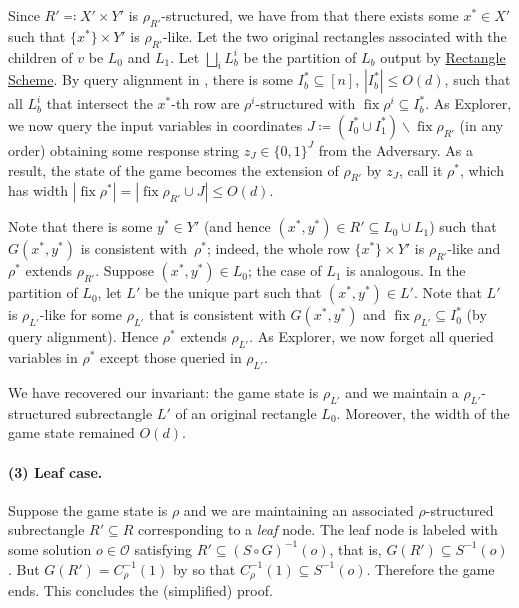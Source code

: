\documentclass{toc}
\newcommand{\rectlemma}{\expref{Lemma}{lem:scheme}\xspace}%
\newcommand{\rectscheme}{\hyperref[alg:partition]{Rectangle Scheme}\xspace}
\DeclareMathOperator{\fix}{fix}
\newcommand{\calO}{\mathcal{O}}
\begin{document}
Since $R' \eqqcolon X' \times Y'$ is $\rho_{R'}$-structured, we have from  that there exists some $x^*\in X'$ such that $\{x^*\}\times Y'$ is $\rho_{R'}$-like. Let the two original rectangles associated with the children of $v$ be $L_0$ and $L_1$. Let $\bigsqcup_i L_b^i$ be the partition of $L_b$ output by \rectscheme. By query alignment in \rectlemma, there is some $I_b^*\subseteq [n]$, $|I_b^*|\leq O(d)$, such that all $L_b^i$ that intersect the $x^*$-th row are $\rho^i$-structured with $\fix\rho^i\subseteq I_b^*$. As Explorer, we now query the input variables in coordinates $J\coloneqq (I_0^* \cup I_1^*) \smallsetminus \fix\rho_{R'}$ (in any order) obtaining some response string $z_J\in\{0,1\}^J$ from the Adversary. As a result, the state of the game becomes the extension of $\rho_{R'}$ by $z_J$, call it $\rho^*$, which has width $|\!\fix\rho^*|=|\!\fix\rho_{R'}\cup J|\leq O(d)$.

Note that there is some $y^*\in Y'$ (and hence $(x^*, y^*) \in R'\subseteq L_0\cup L_1$) such that $G(x^*,y^*)$ is consistent with~$\rho^*$; indeed, the whole row $\{x^*\}\times Y'$ is $\rho_{R'}$-like and $\rho^*$ extends $\rho_{R'}$. Suppose $(x^*, y^*) \in L_0$; the case of $L_1$ is analogous. In the partition of $L_0$, let $L'$ be the unique part such that $(x^*,y^*)\in L'$. Note that $L'$ is $\rho_{L'}$-like for some $\rho_{L'}$ that is consistent with $G(x^*,y^*)$ and $\fix\rho_{L'}\subseteq I_0^*$ (by query alignment). Hence $\rho^*$ extends $\rho_{L'}$. As Explorer, we now forget all queried variables in $\rho^*$ except those queried in $\rho_{L'}$.

We have recovered our invariant: the game state is $\rho_{L'}$ and we maintain a $\rho_{L'}$-structured subrectangle $L'$ of an original rectangle $L_0$. Moreover, the width of the game state remained $O(d)$.

\paragraph{(3) Leaf case.}
Suppose the game state is $\rho$ and we are maintaining an associated $\rho$-structured subrectangle $R'\subseteq R$ corresponding to a \emph{leaf} node. The leaf node is labeled with some solution $o\in \calO$ satisfying $R'\subseteq (S\circ G)^{-1}(o)$, that is, $G(R')\subseteq S^{-1}(o)$. But $G(R')=C_\rho^{-1}(1)$ by  so that $C_\rho^{-1}(1)\subseteq S^{-1}(o)$. Therefore the game ends. This concludes the (simplified) proof.
\end{document}
